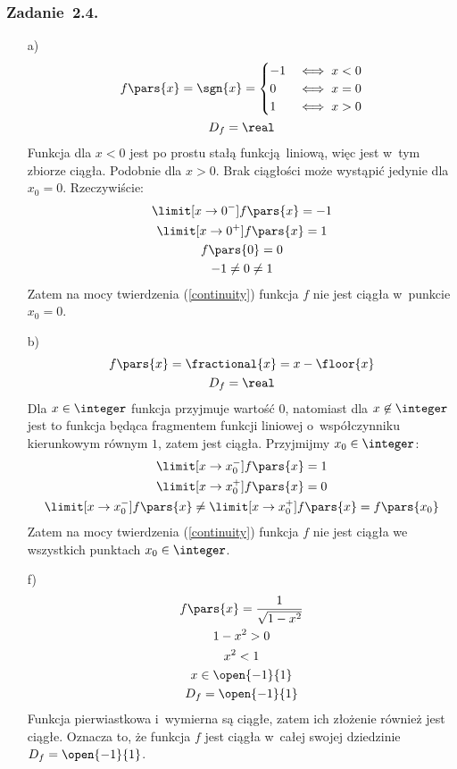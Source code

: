 \subsubsection*{Zadanie~2.4.}
\begin{itemize}
    \item[a)]
        \begin{gather*}
            f\pars{x} = \sgn{x} = \begin{cases}
                -1 & \iff x < 0\\
                0 & \iff x = 0\\
                1 & \iff x > 0
            \end{cases}\\
            D_f = \real
        \end{gather*}
        Funkcja dla \(x < 0\) jest po prostu stałą funkcją liniową, więc jest w~tym zbiorze ciągła. Podobnie dla \(x > 0\). Brak ciągłości może wystąpić jedynie dla \(x_0 = 0\). Rzeczywiście:
        \begin{gather*}
            \limit[x \to 0^-] f\pars{x} = -1\\
            \limit[x \to 0^+] f\pars{x} = 1\\
            f\pars{0} = 0\\
            -1 \neq 0 \neq 1
        \end{gather*}
        Zatem na mocy twierdzenia (\ref{continuity}) funkcja \(f\) nie jest ciągła w~punkcie \(x_0 = 0\).
    \item[b)]
        \begin{gather*}
            f\pars{x} = \fractional{x} = x - \floor{x}\\
            D_f = \real
        \end{gather*}
        Dla \(x \in \integer\) funkcja przyjmuje wartość \(0\), natomiast dla \(x \not\in \integer\) jest to funkcja będąca fragmentem funkcji liniowej o~współczynniku kierunkowym równym \(1\), zatem jest ciągła. Przyjmijmy \(x_0 \in \integer\):
        \begin{gather*}
            \limit[x \to x_0^-] f\pars{x} = 1\\
            \limit[x \to x_0^+] f\pars{x} = 0\\
            \limit[x \to x_0^-] f\pars{x} \neq \limit[x \to x_0^+] f\pars{x} = f\pars{x_0}
        \end{gather*}
        Zatem na mocy twierdzenia (\ref{continuity}) funkcja \(f\) nie jest ciągła we wszystkich punktach \(x_0 \in \integer\).
    \item[f)]
        \begin{gather*}
            f\pars{x} = \frac{1}{\sqrt{1 - x^2}}\\
            1 - x^2 > 0\\
            x^2 < 1\\
            x \in \open{-1}{1}\\
            D_f = \open{-1}{1}
        \end{gather*}
        Funkcja pierwiastkowa i~wymierna są ciągłe, zatem ich złożenie również jest ciągłe. Oznacza to, że funkcja \(f\) jest ciągła w~całej swojej dziedzinie \(D_f = \open{-1}{1}\).
\end{itemize}
